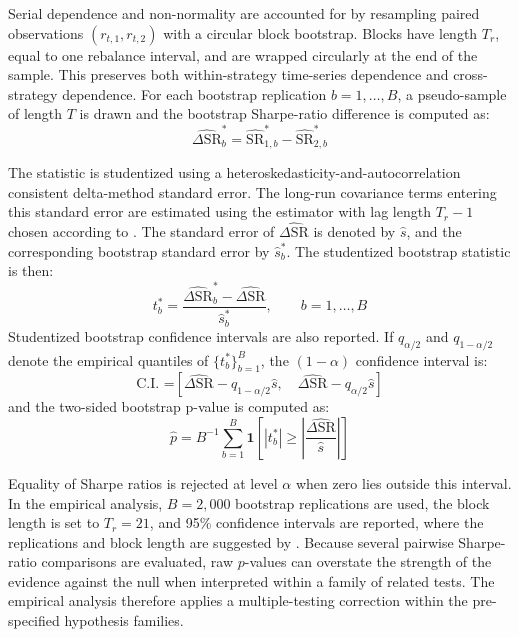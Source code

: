 \documentclass[12pt]{article}
\begin{document}
Serial dependence and non-normality are accounted for by resampling paired observations $(r_{t,1},r_{t,2})$ with a circular block bootstrap. Blocks have length $T_r$, equal to one rebalance interval, and are wrapped circularly at the end of the sample. This preserves both within-strategy time-series dependence and cross-strategy dependence. For each bootstrap replication $b=1,\dots,B$, a pseudo-sample of length $T$ is drawn and the bootstrap Sharpe-ratio difference is computed as:
\begin{equation}
\widehat{\Delta \mathrm{SR}}_b^{*}
=
\widehat{\mathrm{SR}}_{1,b}^{*}
-
\widehat{\mathrm{SR}}_{2,b}^{*}
\label{eq:LW_boot_diff}
\end{equation}

The statistic is studentized using a heteroskedasticity-and-autocorrelation consistent delta-method standard error. The long-run covariance terms entering this standard error are estimated using the \cite{neweywest1987} estimator with lag length $T_r-1$ chosen according to \cite{neweywest1994}. The standard error of $\widehat{\Delta \mathrm{SR}}$ is denoted by $\widehat{s}$, and the corresponding bootstrap standard error by $\widehat{s}_b^{*}$. The studentized bootstrap statistic is then:
\begin{equation}
t_b^{*}
=
\frac{
\widehat{\Delta \mathrm{SR}}_b^{*}
-
\widehat{\Delta \mathrm{SR}}
}{
\widehat{s}_b^{*}
},
\qquad b=1,\dots,B
\end{equation}
Studentized bootstrap confidence intervals are also reported. If $q_{\alpha/2}$ and $q_{1-\alpha/2}$ denote the empirical quantiles of $\{t_b^{*}\}_{b=1}^{B}$, the $(1-\alpha)$ confidence interval is:
\begin{equation}
\text{C.I. =}
\left[
\widehat{\Delta \mathrm{SR}}
-
q_{1-\alpha/2}\widehat{s},
\quad
\widehat{\Delta \mathrm{SR}}
-
q_{\alpha/2}\widehat{s}
\right]
\label{eq:LW_studentized_CI}
\end{equation}
and the two-sided bootstrap p-value is computed as:
\begin{equation}
\hat p
=
B^{-1}
\sum_{b=1}^{B}
\mathbf{1}
\left[
|t_b^{*}|
\geq
|\frac{\widehat{\Delta \mathrm{SR}}}{\widehat{s}}|
\right]
\label{eq:LW_studentized_p}
\end{equation}

Equality of Sharpe ratios is rejected at level $\alpha$ when zero lies outside this interval. In the empirical analysis, $B=2{,}000$ bootstrap replications are used, the block length is set to $T_r=21$, and 95\% confidence intervals are reported, where the replications and block length are suggested by \cite{ledoitwolf2008}. Because several pairwise Sharpe-ratio comparisons are evaluated, raw $p$-values can overstate the strength of the evidence against the null when interpreted within a family of related tests. The empirical analysis therefore applies a multiple-testing correction within the pre-specified hypothesis families. 
\end{document}
